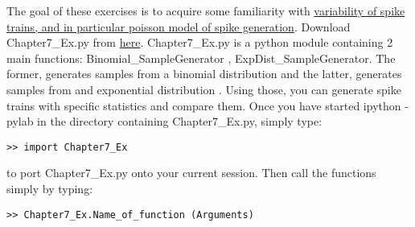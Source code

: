 \documentclass[a4paper,10pt]{Exercises}
\begin{document}
\newcommand{\erf}{\textrm{erf}}


The goal of these exercises is to acquire some familiarity with \href{http://neuronaldynamics.epfl.ch/online/Ch7.S2.html}{variability of spike trains, and  in particular poisson model of spike generation}.
Download Chapter7\_Ex.py  from  \href{http://neuronaldynamics.epfl.ch/lectures.html}{here}.  Chapter7\_Ex.py is a python module containing 2 main functions:  Binomial\_SampleGenerator , ExpDist\_SampleGenerator. The former, generates samples from a  binomial distribution and the latter, generates samples from and exponential distribution . Using those, you can generate spike trains with specific statistics and compare them. Once you have started ipython -pylab in the directory containing Chapter7\_Ex.py, simply type:
\begin{verbatim}
>> import Chapter7_Ex
\end{verbatim}
to port Chapter7\_Ex.py onto your current session. Then call the functions simply by typing:
\begin{verbatim}
>> Chapter7_Ex.Name_of_function (Arguments)
\end{verbatim}
\end{document}
